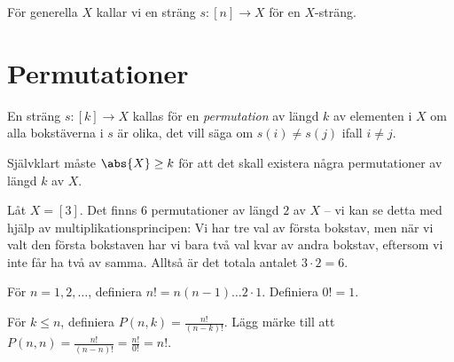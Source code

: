 \documentclass{tufte-handout}
\begin{document}
För generella $X$ kallar vi en sträng $s: [n] \to X$ för en $X$-sträng.

\section{Permutationer}

\begin{definition}
	En sträng $s: [k] \to X$ kallas för en \emph{permutation} av längd $k$ av elementen i $X$ om alla bokstäverna i $s$ är olika, det vill säga om $s(i) \neq s(j)$ ifall $i \neq j$.
\end{definition}

Självklart måste $\abs{X} \geq k$ för att det skall existera några permutationer av längd $k$ av $X$.

\begin{example}
	Låt $X = [3]$. Det finns $6$ permutationer av längd $2$ av $X$ -- vi kan se detta med hjälp av multiplikationsprincipen: Vi har tre val av första bokstav, men när vi valt den första bokstaven har vi bara två val kvar av andra bokstav, eftersom vi inte får ha två av samma. Alltså är det totala antalet $3\cdot 2 = 6$.
\end{example}

\begin{definition}
	För $n = 1, 2,\ldots$, definiera $n! = n(n-1)\ldots2\cdot1$. Definiera $0! = 1$.

	För $k \leq n$, definiera $P(n,k) = \frac{n!}{(n-k)!}$. Lägg märke till att $P(n,n) = \frac{n!}{(n-n)!} = \frac{n!}{0!} = n!$.
\end{definition}
\end{document}
